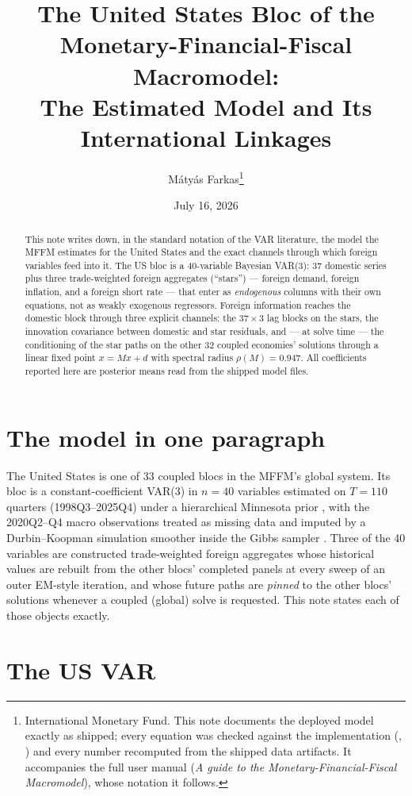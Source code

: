 \documentclass[11pt]{article}
\title{The United States Bloc of the Monetary-Financial-Fiscal Macromodel:\\
The Estimated Model and Its International Linkages}
\author{M\'aty\'as Farkas\thanks{International Monetary Fund. This note documents the deployed
model exactly as shipped; every equation was checked against the implementation
(\code{pipeline/*.m}, \code{app/src/lib/compute/*.ts}) and every number recomputed from the
shipped data artifacts. It accompanies the full user manual (\emph{A guide to the
Monetary-Financial-Fiscal Macromodel}), whose notation it follows.}}
\date{July 16, 2026}
\begin{document}
\maketitle

\begin{abstract}
\noindent This note writes down, in the standard notation of the VAR literature, the model the
MFFM estimates for the United States and the exact channels through which foreign variables feed
into it. The US bloc is a 40-variable Bayesian VAR(3): 37 domestic series plus three
trade-weighted foreign aggregates (``stars'') --- foreign demand, foreign inflation, and a foreign
short rate --- that enter as \emph{endogenous} columns with their own equations, not as weakly
exogenous regressors. Foreign information reaches the domestic block through three explicit
channels: the $37\times3$ lag blocks on the stars, the innovation covariance between domestic and
star residuals, and --- at solve time --- the conditioning of the star paths on the other 32
coupled economies' solutions through a linear fixed point $x = Mx + d$ with spectral radius
$\rho(M)=0.947$. All coefficients reported here are posterior means read from the shipped model
files.
\end{abstract}

\section{The model in one paragraph}

The United States is one of 33 coupled blocs in the MFFM's global system. Its bloc is a
constant-coefficient VAR(3) in $n=40$ variables estimated on $T=110$ quarters (1998Q3--2025Q4)
under a hierarchical Minnesota prior \citep{Litterman1986,Giannone2015}, with the 2020Q2--Q4
macro observations treated as missing data and imputed by a Durbin--Koopman simulation smoother
inside the Gibbs sampler \citep{DurbinKoopman2002,TannerWong1987}. Three of the 40 variables are
constructed trade-weighted foreign aggregates whose historical values are rebuilt from the other
blocs' completed panels at every sweep of an outer EM-style iteration, and whose future paths are
\emph{pinned} to the other blocs' solutions whenever a coupled (global) solve is requested. This
note states each of those objects exactly.

\section{The US VAR}\label{sec:var}
\end{document}
